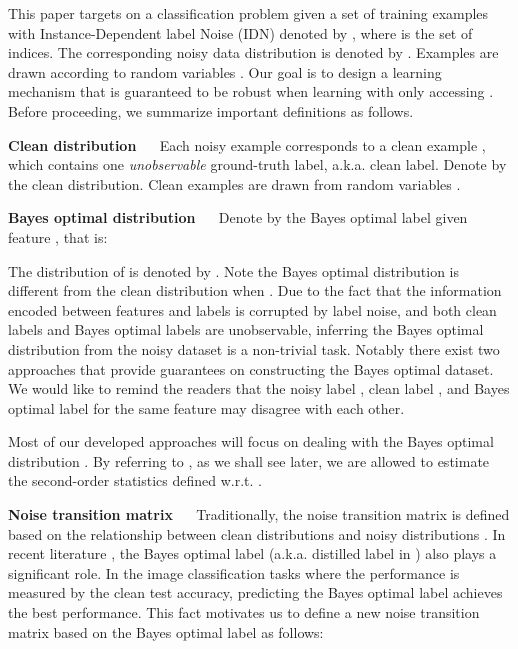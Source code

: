 \documentclass[final]{cvpr}
\newcommand{\rev}[1]{{\color{blue}#1}}
\newcommand{\rev}[1]{#1}
\begin{document}
This paper targets on a classification problem given a set of  training examples with Instance-Dependent label Noise (IDN) denoted by , where  is the set of indices.
The corresponding noisy data distribution is denoted by .
Examples  are drawn according to random variables . 
Our goal is to design a learning mechanism that is guaranteed to be robust when learning with only accessing .
Before proceeding, we summarize important definitions as follows.

\noindent\textbf{Clean distribution }~~
Each noisy example  corresponds to a clean example , which contains one \emph{unobservable} ground-truth label, a.k.a. clean label.
Denote by  the clean distribution. Clean examples  are drawn from random variables .

\noindent\textbf{Bayes optimal distribution }~~
Denote by  the Bayes optimal label given feature , that is:

The distribution of  is denoted by . Note the Bayes optimal distribution  is different from the clean distribution  when .
Due to the fact that the information encoded between features and labels is corrupted by label noise, and both clean labels and Bayes optimal labels are unobservable, inferring the Bayes optimal distribution  from the noisy dataset  is a non-trivial task.
\rev{Notably there exist two approaches \cite{sieve2020,cheng2017learningdistill} that provide guarantees on constructing the Bayes optimal dataset. We would like to remind the readers that the noisy label , clean label , and Bayes optimal label  for the same feature  may disagree with each other.}

Most of our developed approaches will focus on dealing with the Bayes optimal distribution . 
{By referring to , as we shall see later, we are allowed to estimate the second-order statistics defined w.r.t. .} 

\noindent\textbf{Noise transition matrix }~~
Traditionally, the noise transition matrix is defined based on the relationship between clean distributions and noisy distributions \cite{sieve2020,liu2019peer,Patrini_2017_CVPR,xia2020parts}.
In recent literature \cite{cheng2017learningdistill}, the Bayes optimal label (a.k.a. distilled label in \cite{cheng2017learningdistill}) also plays a significant role.
In the image classification tasks where the performance is measured by the clean test accuracy, predicting the Bayes optimal label achieves the best performance. 
This fact motivates us to define a new noise transition matrix based on the Bayes optimal label as follows:
\end{document}
